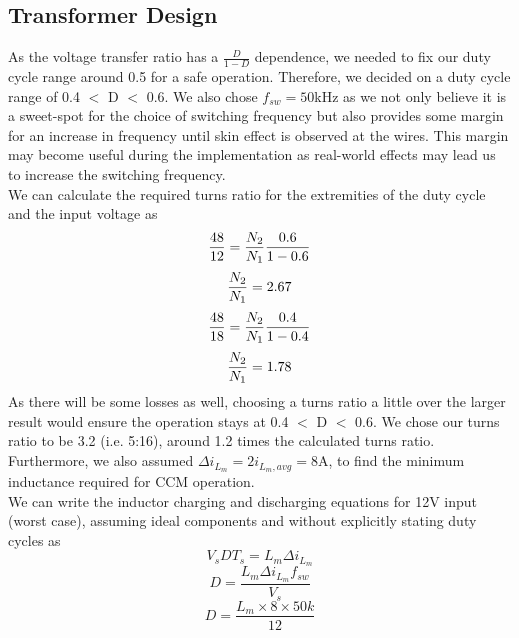 \subsection{Transformer Design}
As the voltage transfer ratio has a $\frac{D}{1-D}$ dependence, we needed to fix our duty cycle range around 0.5 for a safe operation. Therefore, we decided on a duty cycle range of 0.4 $<$ D $<$ 0.6. We also chose $f_{sw}=50$kHz as we not only believe it is a sweet-spot for the choice of switching frequency but also provides some margin for an increase in frequency until skin effect is observed at the wires. This margin may become useful during the implementation as real-world effects may lead us to increase the switching frequency.  \\
We can calculate the required turns ratio for the extremities of the duty cycle and the input voltage as
\begin{equation*} \medskip \\
    \frac{48}{12} = \frac{N_2}{N_1} \frac{0.6}{1-0.6}
\end{equation*}
\begin{equation*} \medskip \\
    \frac{N_2}{N_1} = 2.67
\end{equation*}
\begin{equation*} \medskip \\
    \frac{48}{18} = \frac{N_2}{N_1} \frac{0.4}{1-0.4}
\end{equation*}
\begin{equation*} \medskip \\
    \frac{N_2}{N_1} = 1.78
\end{equation*}
As there will be some losses as well, choosing a turns ratio a little over the larger result would ensure the operation stays at 0.4 $<$ D $<$ 0.6. We chose our turns ratio to be 3.2 (i.e. 5:16), around 1.2 times the calculated turns ratio. Furthermore, we also assumed $\Delta i_{L_m} = 2i_{L_m,avg} = 8$A, to find the minimum inductance required for CCM operation. \\
We can write the inductor charging and discharging equations for 12V input (worst case), assuming ideal components and without explicitly stating duty cycles as
\begin{equation*}
    V_s D T_s = L_m \Delta i_{L_m}
\end{equation*}
\begin{equation*}
    D = \frac{L_m \Delta i_{L_m} f_{sw}}{V_s}
\end{equation*}
\begin{equation*}
    D = \frac{L_m \times 8 \times 50k}{12}
\end{equation*}
